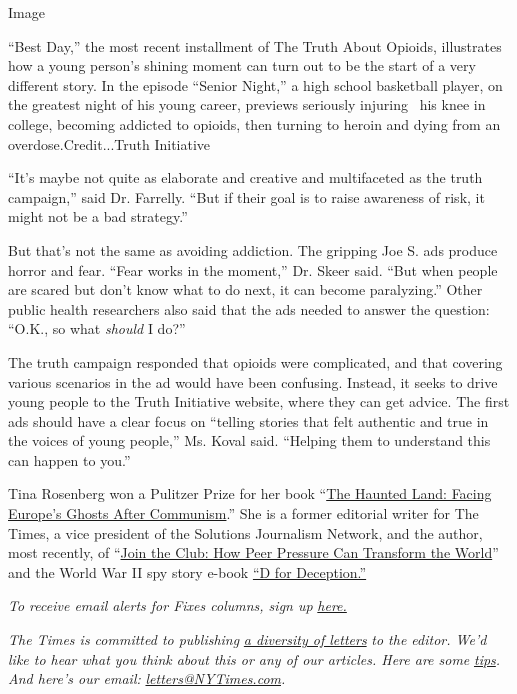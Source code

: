 Image

``Best Day,'' the most recent installment of The Truth About Opioids,
illustrates how a young person's shining moment can turn out to be the
start of a very different story. In the episode ``Senior Night,'' a high
school basketball player, on the greatest night of his young career,
previews seriously injuring~ his knee in college, becoming addicted to
opioids, then turning to heroin and dying from an
overdose.Credit...Truth Initiative

``It's maybe not quite as elaborate and creative and multifaceted as the
truth campaign,'' said Dr. Farrelly. ``But if their goal is to raise
awareness of risk, it might not be a bad strategy.''

But that's not the same as avoiding addiction. The gripping Joe S. ads
produce horror and fear. ``Fear works in the moment,'' Dr. Skeer said.
``But when people are scared but don't know what to do next, it can
become paralyzing.'' Other public health researchers also said that the
ads needed to answer the question: ``O.K., so what \emph{should} I do?''

The truth campaign responded that opioids were complicated, and that
covering various scenarios in the ad would have been confusing. Instead,
it seeks to drive young people to the Truth Initiative website, where
they can get advice. The first ads should have a clear focus on
``telling stories that felt authentic and true in the voices of young
people,'' Ms. Koval said. ``Helping them to understand this can happen
to you.''

Tina Rosenberg won a Pulitzer Prize for her book
``\href{http://www.randomhouse.com/catalog/display.pperl?isbn=9780679744993}{The
Haunted Land: Facing Europe's Ghosts After Communism}.'' She is a former
editorial writer for The Times, a vice president of the Solutions
Journalism Network, and the author, most recently, of
``\href{http://books.wwnorton.com/books/Join-the-Club}{Join the Club:
How Peer Pressure Can Transform the World}'' and the World War II spy
story e-book
\href{https://www.goodreads.com/book/show/16124470-d-for-deception}{``D
for Deception.''}

\emph{To receive email alerts for Fixes columns, sign up}
\href{http://eepurl.com/ABIxL}{\emph{here.}}

\emph{The Times is committed to publishing}
\href{https://www.nytimes3xbfgragh.onion/2019/01/31/opinion/letters/letters-to-editor-new-york-times-women.html}{\emph{a
diversity of letters}} \emph{to the editor. We'd like to hear what you
think about this or any of our articles. Here are some}
\href{https://help.nytimes3xbfgragh.onion/hc/en-us/articles/115014925288-How-to-submit-a-letter-to-the-editor}{\emph{tips}}\emph{.
And here's our email:}
\href{mailto:letters@NYTimes.com}{\emph{letters@NYTimes.com}}\emph{.}

